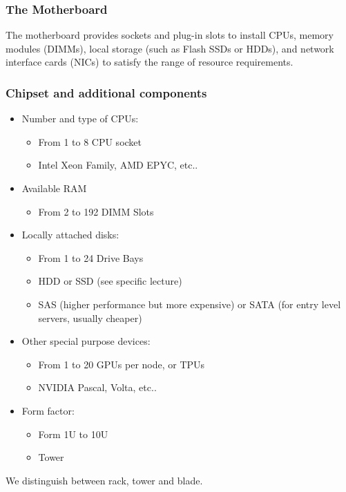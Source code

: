 \documentclass[10pt, oneside]{article}
\begin{document}
\subsubsection{The Motherboard}
The motherboard provides sockets and plug-in slots to install CPUs, memory modules (DIMMs), local storage (such as Flash SSDs or HDDs), and network interface cards (NICs) to satisfy the range of resource requirements.
\subsubsection{Chipset and additional components}
\begin{itemize}
    \item Number and type of CPUs:
\begin{itemize}
    \item From 1 to 8 CPU socket
    \item Intel Xeon Family, AMD EPYC, etc..
\end{itemize}
    \item Available RAM
    \begin{itemize}
        \item From 2 to 192 DIMM Slots
    \end{itemize}
    \item Locally attached disks:
    \begin{itemize}
        \item From 1 to 24 Drive Bays
        \item HDD or SSD (see specific lecture)
        \item SAS (higher performance but more expensive) or SATA (for entry level servers, usually cheaper)
    \end{itemize}
    \item Other special purpose devices:
    \begin{itemize}
        \item From 1 to 20 GPUs per node, or TPUs
        \item NVIDIA Pascal, Volta, etc..
    \end{itemize}
    \item Form factor:
    \begin{itemize}
        \item Form 1U to 10U
        \item Tower
    \end{itemize}
\end{itemize}
We distinguish between rack, tower and blade.
\end{document}
